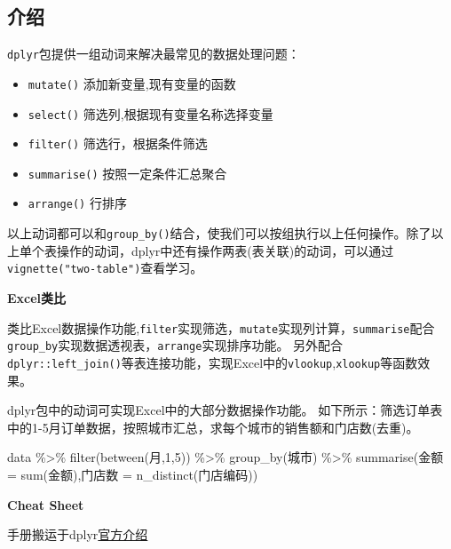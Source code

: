 \documentclass[
]{book}
\newenvironment{Shaded}{\begin{snugshade}}{\end{snugshade}}
\newcommand{\DecValTok}[1]{\textcolor[rgb]{0.00,0.00,0.81}{#1}}
\newcommand{\FunctionTok}[1]{\textcolor[rgb]{0.00,0.00,0.00}{#1}}
\newcommand{\NormalTok}[1]{#1}
\newcommand{\OtherTok}[1]{\textcolor[rgb]{0.56,0.35,0.01}{#1}}
\newcommand{\SpecialCharTok}[1]{\textcolor[rgb]{0.00,0.00,0.00}{#1}}
\begin{document}
\hypertarget{ux4ecbux7ecd}{%
\subsection{介绍}\label{ux4ecbux7ecd}}

\texttt{dplyr}包提供一组动词来解决最常见的数据处理问题：

\begin{itemize}
\item
  \texttt{mutate()} 添加新变量,现有变量的函数
\item
  \texttt{select()} 筛选列,根据现有变量名称选择变量
\item
  \texttt{filter()} 筛选行，根据条件筛选
\item
  \texttt{summarise()} 按照一定条件汇总聚合
\item
  \texttt{arrange()} 行排序
\end{itemize}

以上动词都可以和\texttt{group\_by()}结合，使我们可以按组执行以上任何操作。除了以上单个表操作的动词，dplyr中还有操作两表(表关联)的动词，可以通过\texttt{vignette("two-table")}查看学习。

\textbf{Excel类比}

类比Excel数据操作功能,\texttt{filter}实现筛选，\texttt{mutate}实现列计算，\texttt{summarise}配合\texttt{group\_by}实现数据透视表，\texttt{arrange}实现排序功能。
另外配合\texttt{dplyr::left\_join()}等表连接功能，实现Excel中的\texttt{vlookup},\texttt{xlookup}等函数效果。

dplyr包中的动词可实现Excel中的大部分数据操作功能。
如下所示：筛选订单表中的1-5月订单数据，按照城市汇总，求每个城市的销售额和门店数(去重)。

\begin{Shaded}
\begin{Highlighting}[]
\NormalTok{data }\SpecialCharTok{\%\textgreater{}\%} 
  \FunctionTok{filter}\NormalTok{(}\FunctionTok{between}\NormalTok{(月,}\DecValTok{1}\NormalTok{,}\DecValTok{5}\NormalTok{)) }\SpecialCharTok{\%\textgreater{}\%} 
  \FunctionTok{group\_by}\NormalTok{(城市) }\SpecialCharTok{\%\textgreater{}\%} 
  \FunctionTok{summarise}\NormalTok{(金额 }\OtherTok{=} \FunctionTok{sum}\NormalTok{(金额),门店数 }\OtherTok{=} \FunctionTok{n\_distinct}\NormalTok{(门店编码))}
\end{Highlighting}
\end{Shaded}

\textbf{Cheat Sheet}

手册搬运于dplyr\href{https://dplyr.tidyverse.org/}{官方介绍}
\end{document}
